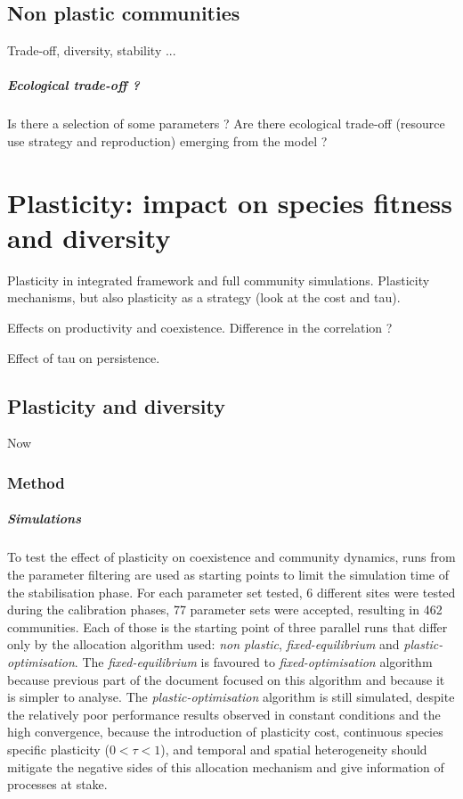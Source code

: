 \section{Non plastic communities}
Trade-off, diversity, stability ...


\paragraph{Ecological trade-off ?}
Is there a selection of some parameters ? Are there ecological trade-off (resource use strategy and reproduction) emerging from the model ?

\chapter{Plasticity: impact on species fitness and diversity}

Plasticity in integrated framework and full community simulations. Plasticity mechanisms, but also plasticity as a strategy (look at the cost and tau). 

Effects on productivity and coexistence. Difference in the correlation ?

Effect of tau on persistence.

\section{Plasticity and diversity}

Now 

\subsection{Method}

\paragraph{Simulations}
To test the effect of plasticity on coexistence and community dynamics, runs from the parameter filtering are used as starting points to limit the simulation time of the stabilisation phase. For each parameter set tested, 6 different sites were tested during the calibration phases, 77 parameter sets were accepted, resulting in 462 communities. Each of those is the starting point of three parallel runs that differ only by the allocation algorithm used: \textit{non plastic}, \textit{fixed-equilibrium} and \textit{plastic-optimisation}. The \textit{fixed-equilibrium} is favoured to \textit{fixed-optimisation} algorithm because previous part of the document focused on this algorithm and because it is simpler to analyse. The \textit{plastic-optimisation} algorithm is still simulated, despite the relatively poor performance results observed in constant conditions and the high convergence, because the introduction of plasticity cost, continuous species specific plasticity ($0 < \tau < 1$), and temporal and spatial heterogeneity should mitigate the negative sides of this allocation mechanism and give information of processes at stake.




